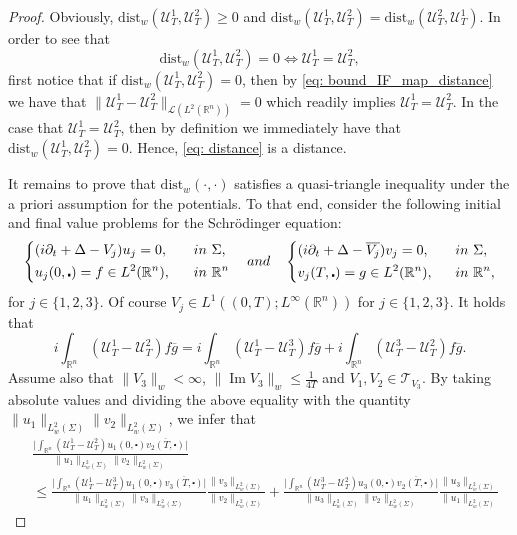 \documentclass[10pt,a4paper]{amsart}
\def\Im{\mathop\mathrm{Im}}
\newcommand{\R}{\mathbb{R}}
\def\cal{\mathcal}
\def\cd{\centerdot}
\def\d{\partial}
\newcommand{\dist}{\mathrm{dist}}
\def\ovl{\overline}
\begin{document}
\begin{proof}
Obviously, $\dist_{w}(\cal{U}_T^1, \cal{U}_T^2) \geq 0$ and $\dist_{w}(\cal{U}_T^1, \cal{U}_T^2) = \dist_{w}(\cal{U}_T^2, \cal{U}_T^1)$. In order to see that 
%
\[
\dist_{w}(\cal{U}_T^1, \cal{U}_T^2) = 0 \Longleftrightarrow \cal{U}_T^1 = \cal{U}_T^2,
\]
%
first notice that if $\dist_{w}(\cal{U}_T^1, \cal{U}_T^2) = 0$, then by \eqref{eq: bound_IF_map_distance} we have that $\| \cal{U}_T^1 - \cal{U}_T^2\|_{\cal{L}(L^2(\R^n))} = 0$ which readily implies $\cal{U}_T^1=\cal{U}_T^2$. 
%
In the case that $\cal{U}_T^1 = \cal{U}_T^2$, then by definition we immediately have that $\dist_{w}(\cal{U}_T^1, \cal{U}_T^2) = 0$. 
Hence, \eqref{eq: distance} is a distance.

It remains to prove that $\dist_w(\cdot, \cdot)$ satisfies a quasi-triangle inequality under the a priori assumption for the potentials. 
To that end, consider the following initial and final value problems for the Schr\"odinger equation:
%
\[
\begin{dcases}
(i\d_t+\Delta - V_j)u_j = 0, \quad &\textup{in}\,\, \Sigma, \\
u_j(0, \cd) = f \in L^2(\R^n), &\textup{in}\,\, \R^n
\end{dcases} 
%
\quad \textup{and} \quad
%
\begin{dcases}
(i\d_t+\Delta - \ovl{V_j})v_j = 0, \quad &\textup{in}\,\, \Sigma, \\
v_j(T, \cd) = g\in L^2(\R^n), &\textup{in}\,\, \R^n,
\end{dcases} 
\]
%
for $ j\in \{1, 2, 3\}$. Of course $V_j \in L^1((0, T); L^\infty(\R^n))$ for $j\in\{ 1, 2, 3 \}$. 
%
It holds that 
%
\[
i \int_{\R^n} (\cal{U}^1_T -\cal{U}^2_T) f \ovl{g} = i\int_{\R^n} (\cal{U}^1_T - \cal{U}^3_T)f\ovl{g} + i \int_{\R^n}(\cal{U}_T^3-\cal{U}^2_T)f \ovl{g}.
\]
%
Assume also that $\|V_3\|_w<\infty$, $\| \Im V_3 \|_w \leq \frac{1}{4T}$ and $V_1, V_2 \in \cal{T}_{V_3}$.
By taking absolute values and dividing the above equality with the quantity $\|u_1\|_{L^2_w(\Sigma)} \|v_2\|_{L^2_w(\Sigma)}$, we infer that
%
\begin{align*}
&\frac{\Big| \displaystyle \int_{\R^n} (\cal{U}^1_T -\cal{U}^2_T) u_1(0, \cd) \ovl{v_2(T, \cd)}\Big|}{\|u_1\|_{L^2_w(\Sigma)} \|v_2\|_{L^2_w(\Sigma)}} \\
%
&\leq \frac{\Big| \displaystyle \int_{\R^n} (\cal{U}^1_T -\cal{U}^3_T) u_1(0, \cd) \ovl{v_3(T, \cd)}\Big|}{\|u_1\|_{L^2_w(\Sigma)} \|v_3\|_{L^2_w(\Sigma)}} \frac{\|v_3\|_{L^2_w(\Sigma)}}{\|v_2\|_{L^2_w(\Sigma)}}
%
+ \frac{\Big| \displaystyle \int_{\R^n} (\cal{U}^3_T -\cal{U}^2_T) u_3(0, \cd) \ovl{v_2(T, \cd)}\Big|}{\|u_3\|_{L^2_w(\Sigma)} \|v_2\|_{L^2_w(\Sigma)}} \frac{\|u_3\|_{L^2_w(\Sigma)}}{\|u_1\|_{L^2_w(\Sigma)}}

\end{align*}
\end{proof}
\end{document}
